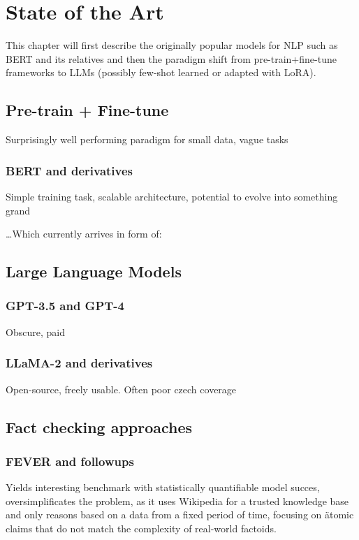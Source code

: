 
\chapter{State of the Art}
This chapter will first describe the originally popular models for NLP such as BERT and its relatives and then the paradigm shift from pre-train+fine-tune frameworks to LLMs (possibly few-shot learned or adapted with LoRA). 

\label{chap:sota}
\section{Pre-train + Fine-tune}
\label{sec:pretrain}
Surprisingly well performing paradigm for small data, vague tasks
\subsection{BERT and derivatives}
Simple training task, scalable architecture, potential to evolve into something grand

\dots Which currently arrives in form of:

\section{Large Language Models}
\label{sec:llms}
\subsection{GPT-3.5 and GPT-4}
\label{sec:gpt}
Obscure, paid
\subsection{LLaMA-2 and derivatives}
\label{sec:llama}
Open-source, freely usable.
Often poor czech coverage

\section{Fact checking approaches}
\subsection{FEVER and followups}
Yields interesting benchmark with statistically quantifiable model succes, oversimplificates the problem, as it uses Wikipedia for a trusted knowledge base and only reasons based on a data from a fixed period of time, focusing on \"{atomic} claims that do not match the complexity of real-world factoids.
